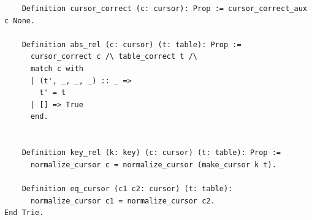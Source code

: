\documentclass[runningheads]{llncs}
\begin{document}
\begin{verbatim}
    Definition cursor_correct (c: cursor): Prop := cursor_correct_aux c None.

    Definition abs_rel (c: cursor) (t: table): Prop :=
      cursor_correct c /\ table_correct t /\
      match c with
      | (t', _, _, _) :: _ =>
        t' = t
      | [] => True
      end.


    Definition key_rel (k: key) (c: cursor) (t: table): Prop :=
      normalize_cursor c = normalize_cursor (make_cursor k t).

    Definition eq_cursor (c1 c2: cursor) (t: table):
      normalize_cursor c1 = normalize_cursor c2.
End Trie.
\end{verbatim}
\end{document}
